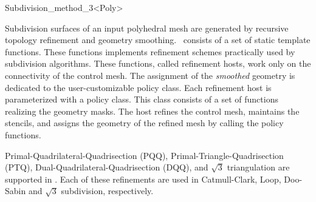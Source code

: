 
\ccRefPageBegin



\begin{ccRefClass}{Subdivision_method_3<Poly>}

\ccDefinition

Subdivision surfaces of an input polyhedral mesh
are generated by recursive topology refinement and geometry
smoothing. \ccClassTemplateName\ consists of a set of static 
template functions. These functions implements refinement schemes 
practically used by subdivision algorithms. These functions,
called refinement hosts, work only on the connectivity of the
control mesh. The assignment of
the \emph{smoothed} geometry is dedicated to the user-customizable
policy class. Each refinement host is parameterized with a 
policy class. This class consists of a set of functions realizing
the geometry masks. 
The host refines the control mesh, maintains the stencils, and assigns the 
geometry of the refined mesh by calling the policy functions.

Primal-Quadrilateral-Quadrisection (PQQ), Primal-Triangle-Quadrisection 
(PTQ), Dual-Quadrilateral-Quadrisection (DQQ), and $\sqrt{3}$ triangulation
are supported in \ccClassTemplateName . Each of these refinements are used in 
Catmull-Clark, Loop, Doo-Sabin and $\sqrt{3}$ subdivision, respectively. 



\end{ccRefClass}
